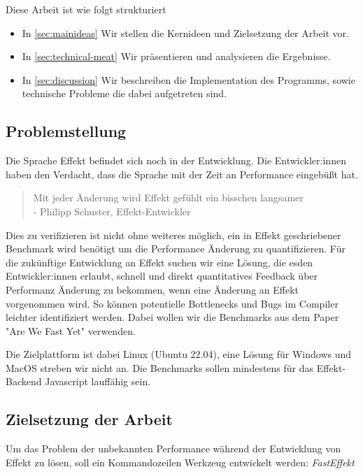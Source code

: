 Diese Arbeit ist wie folgt strukturiert
\begin{itemize}
    \item In \cref{sec:mainideas} Wir stellen die Kernideen und Zielsetzung der Arbeit vor.
    \item In \cref{sec:technical-meat} Wir präsentieren und analysieren die Ergebnisse.
    \item In \cref{sec:discussion} Wir beschreiben die Implementation des Programms, sowie technische Probleme die dabei aufgetreten sind.
\end{itemize}

\subsection{ Problemstellung }
Die Sprache Effekt befindet sich noch in der Entwicklung. Die Entwickler:innen haben den Verdacht, dass die Sprache mit der Zeit an Performance eingebüßt hat.
\begin{center}
    \begin{quote}
        Mit jeder Änderung wird Effekt gefühlt ein bisschen langsamer\\
        - Philipp Schuster, Effekt-Entwickler
    \end{quote}
\end{center}
Dies zu verifizieren ist nicht ohne weiteres möglich, ein in Effekt geschriebener Benchmark wird benötigt um die Performance Änderung zu quantifizieren.
Für die zukünftige Entwicklung an Effekt suchen wir eine Lösung, die esden Entwickler:innen erlaubt, schnell und direkt quantitatives Feedback über Performanz Änderung zu bekommen, wenn eine Änderung an Effekt vorgenommen wird. So können potentielle Bottlenecks und Bugs im Compiler leichter identifiziert werden.
Dabei wollen wir die Benchmarks aus dem Paper "Are We Fast Yet" verwenden.

Die Zielplattform ist dabei Linux (Ubuntu 22.04), eine Lösung für Windows und MacOS streben wir nicht an.
Die Benchmarks sollen mindestens für das Effekt-Backend Javascript lauffähig sein.

\subsection{ Zielsetzung der Arbeit}

Um das Problem der unbekannten Performance während der Entwicklung von Effekt zu lösen, soll ein Kommandozeilen Werkzeug entwickelt werden: \textit{FastEffekt}

